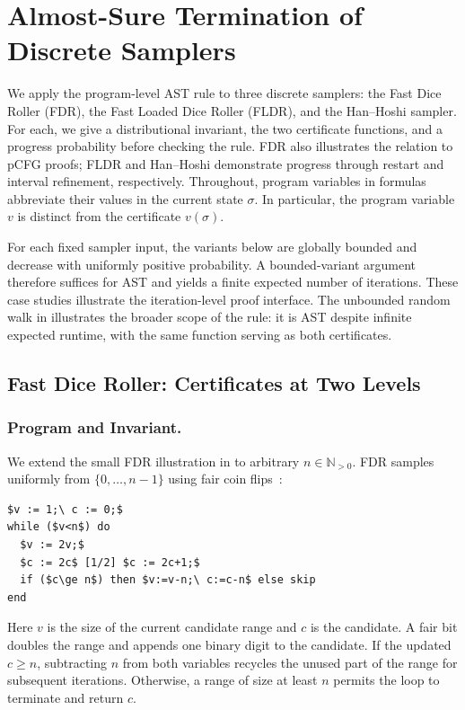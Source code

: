 \section{Almost-Sure Termination of Discrete Samplers}
\label{sec:case-studies}

We apply the program-level AST rule to three discrete samplers: the
Fast Dice Roller (FDR), the Fast Loaded Dice Roller (FLDR), and the
Han--Hoshi sampler. For each, we give a distributional invariant,
the two certificate functions, and a progress probability before
checking the rule. FDR also illustrates the relation to pCFG proofs;
FLDR and Han--Hoshi demonstrate progress through restart and interval
refinement, respectively. Throughout, program variables in formulas
abbreviate their values in the current state $\sigma$. In particular,
the program variable $v$ is distinct from the certificate $v(\sigma)$.

For each fixed sampler input, the variants below are globally bounded
and decrease with uniformly positive probability. A bounded-variant
argument therefore suffices for AST and yields a
finite expected number of iterations. These case studies illustrate
the iteration-level proof interface. The unbounded random walk in
 illustrates the broader scope of the rule:
it is AST despite infinite expected runtime, with the same function
serving as both certificates.

\subsection{Fast Dice Roller: Certificates at Two Levels}
\label{sec:fdr}

\subsubsection{Program and Invariant.}
We extend the small FDR illustration in  to arbitrary
$n\in\mathbb N_{>0}$. FDR samples uniformly from
$\{0,\ldots,n-1\}$ using fair coin
flips~\cite{DBLP:journals/corr/abs-1304-1916}:
\begin{lstlisting}[basicstyle=\ttfamily\small,mathescape=true,frame=single]
$v := 1;\ c := 0;$
while ($v<n$) do
  $v := 2v;$
  $c := 2c$ [1/2] $c := 2c+1;$
  if ($c\ge n$) then $v:=v-n;\ c:=c-n$ else skip
end
\end{lstlisting}
Here $v$ is the size of the current candidate range and $c$ is the
candidate. A fair bit doubles the range and appends one binary digit
to the candidate. If the updated $c\geq n$, subtracting $n$ from both
variables recycles the unused part of the range for subsequent
iterations. Otherwise, a range of size at least $n$ permits the loop
to terminate and return $c$.


